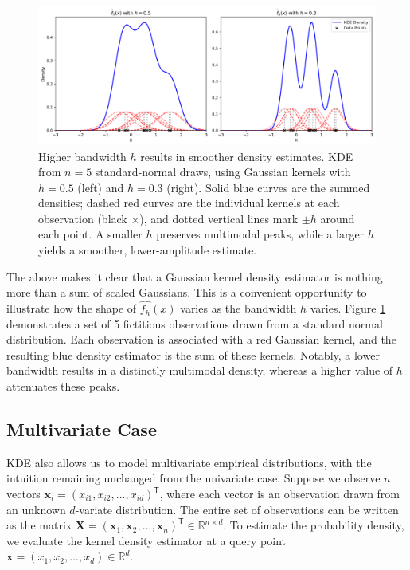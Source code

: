 \begin{figure}[H]
  \begin{center}
  \begin{minipage}{\textwidth}
    \centering
    \includegraphics[width=\textwidth]{images/20_1.png}
  \end{minipage}
  \hfill
  \caption[Effect of bandwidth on KDE densities]{Higher bandwidth $h$ results in smoother density estimates. KDE from $n=5$ standard-normal draws, using Gaussian kernels with $h=0.5$ (left) and $h=0.3$ (right). Solid blue curves are the summed densities; dashed red curves are the individual kernels at each observation (black $\times$), and dotted vertical lines mark $\pm h$ around each point. A smaller $h$ preserves multimodal peaks, while a larger $h$ yields a smoother, lower-amplitude estimate.}
  \label{fig:combined1}
  \end{center}
  \end{figure}
The above makes it clear that a Gaussian kernel density estimator is nothing more than a sum of scaled Gaussians. This is a convenient opportunity to illustrate how the shape of $\hat{f_h}(x)$ varies as the bandwidth $h$ varies. Figure \ref{fig:combined1} demonstrates a set of 5 fictitious observations drawn from a standard normal distribution. Each observation is associated with a red Gaussian kernel, and the resulting blue density estimator is the sum of these kernels. Notably, a lower bandwidth results in a distinctly multimodal density, whereas a higher value of $h$ attenuates these peaks.
  


\subsection{Multivariate Case}

KDE also allows us to model multivariate empirical distributions, with the intuition remaining unchanged from the univariate case. Suppose we observe $n$ vectors $\mathbf{x}_i=(x_{i1}, x_{i2},...,x_{id})^\mathsf{T}$, where each vector is an observation drawn from an unknown $d$-variate distribution. The entire set of observations can be written as the matrix $\mathbf{X}=(\mathbf{x}_1,\mathbf{x}_2,...,\mathbf{x}_n)^{\mathsf{T}}\in\mathbb{R}^{n\times d}$. To estimate the probability density, we evaluate the kernel density estimator at a query point $\mathbf{x}=(x_{1}, x_{2},...,x_{d})\in\mathbb{R}^{d}$.

